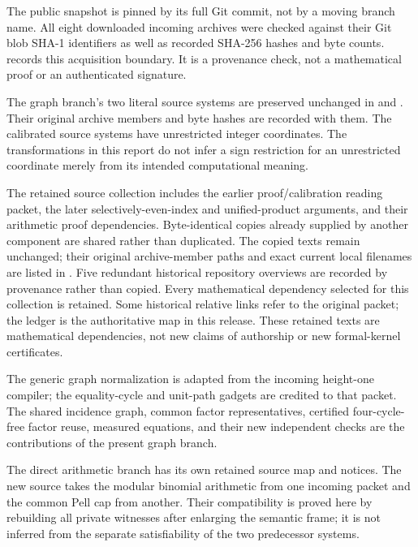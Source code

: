 The public snapshot is pinned by its full Git commit, not by a moving branch
name. All eight downloaded incoming archives were checked against their Git
blob SHA-1 identifiers as well as recorded SHA-256 hashes and byte counts.
 records this acquisition boundary.
It is a provenance check, not a mathematical proof or an authenticated signature.

The graph branch's two literal source systems are preserved unchanged in
 and .
Their original archive members and byte hashes are recorded with them.
The calibrated source systems have unrestricted integer coordinates. The
transformations in this report do not infer a sign restriction for an
unrestricted coordinate merely from its intended computational meaning.

The retained source collection includes the earlier proof/calibration reading
packet, the later selectively-even-index and unified-product arguments, and
their arithmetic proof dependencies. Byte-identical copies already supplied
by another component are shared rather than duplicated. The copied texts
remain unchanged; their original archive-member paths and exact current local
filenames are listed in . Five redundant
historical repository overviews are recorded by provenance rather than copied.
Every mathematical dependency selected for this collection is retained. Some
historical relative links refer to the original packet; the ledger is the
authoritative map in this release. These retained texts are mathematical
dependencies, not new claims of authorship or new formal-kernel certificates.

The generic graph normalization is adapted from the incoming height-one
compiler; the equality-cycle and unit-path gadgets are credited to that
packet. The shared incidence graph, common factor representatives, certified
four-cycle-free factor reuse, measured equations, and their new independent
checks are the contributions of the present graph branch.

The direct arithmetic branch has its own retained source map and notices.
The new source takes the modular binomial arithmetic from one incoming packet
and the common Pell cap from another. Their compatibility is proved here by
rebuilding all private witnesses after enlarging the semantic frame; it is
not inferred from the separate satisfiability of the two predecessor systems.


